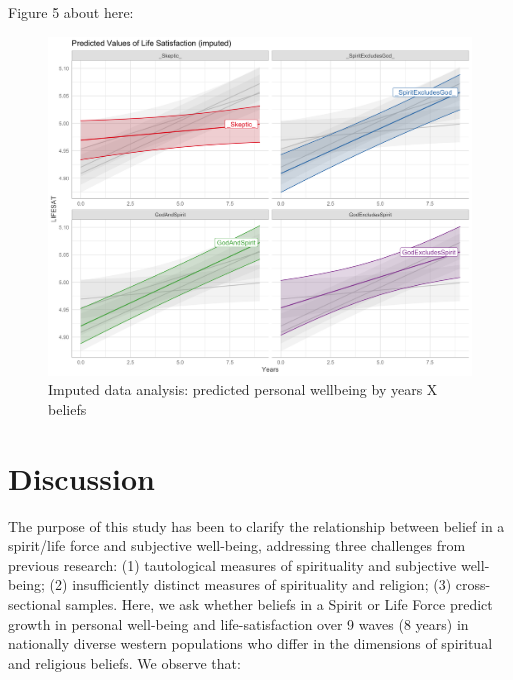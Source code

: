 \documentclass[
  english,
  man]{apa6}
\begin{document}
Figure 5 about here:

\begin{figure}
\includegraphics[width=6.4in]{Figs/predicted_lifesat_imputed-1} \caption{Imputed data analysis: predicted personal wellbeing by years X beliefs}\label{fig:unnamed-chunk-6}
\end{figure}

\hypertarget{discussion}{%
\section{Discussion}\label{discussion}}

The purpose of this study has been to clarify the relationship between belief in a spirit/life force and subjective well-being, addressing three challenges from previous research: (1) tautological measures of spirituality and subjective well-being; (2) insufficiently distinct measures of spirituality and religion; (3) cross-sectional samples. Here, we ask whether beliefs in a Spirit or Life Force predict growth in personal well-being and life-satisfaction over 9 waves (8 years) in nationally diverse western populations who differ in the dimensions of spiritual and religious beliefs. We observe that:
\end{document}
